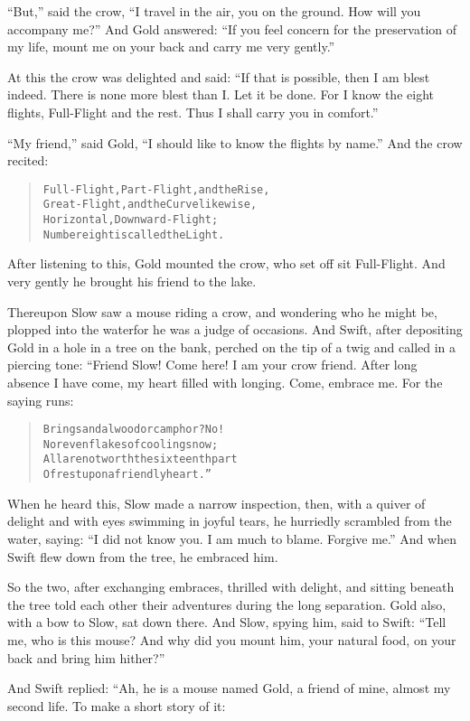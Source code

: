 \documentclass[article, twoside, 14pt]{memoir}
\renewenvironment{verbatim}{%
\begin{quote}%
\vskip -10pt%
\begin{alltt}\normalfont\large}{\end{alltt}%
\end{quote}%
\vskip -10pt
} %
\begin{document}
``But,'' said the crow,
``I travel in the air, you on the ground. How will you accompany me?''
And Gold answered:
``If you feel concern for the preservation of my life, mount me on your back and carry me very gently.''

At this the crow was delighted and said:
``If that is possible, then I am blest indeed. There is none more blest than I. Let it be done. For I know the eight flights, Full-Flight and the rest. Thus I shall carry you in comfort.''

``My friend,'' said Gold,
``I should like to know the flights by name.'' And the crow
recited:

\begin{verbatim}
Full-Flight, Part-Flight, and the Rise,
Great-Flight, and the Curve likewise,
Horizontal, Downward-Flight;
Number eight is called the Light.
\end{verbatim}
After listening to this, Gold mounted the crow, who set off
sit Full-Flight. And very gently he brought his friend to the
lake.

Thereupon Slow saw a mouse riding a crow, and wondering who he
might be, plopped into the water{\textemdash}for he was a judge of occasions.
And Swift, after depositing Gold in a hole in a tree on the bank,
perched on the tip of a twig and called in a piercing tone: “Friend
Slow! Come here! I am your crow friend. After long absence I have
come, my heart filled with longing. Come, embrace me. For the
saying runs:

\begin{verbatim}
Bring sandalwood or camphor? No!
Nor even flakes of cooling snow;
All are not worth the sixteenth part
Of rest upon a friendly heart.”
\end{verbatim}
When he heard this, Slow made a narrow inspection, then, with a
quiver of delight and with eyes swimming in joyful tears, he
hurriedly scrambled from the water, saying:
``I did not know you. I am much to blame. Forgive me.'' And when
Swift flew down from the tree, he embraced him.

So the two, after exchanging embraces, thrilled with delight, and
sitting beneath the tree told each other their adventures during
the long separation. Gold also, with a bow to Slow, sat down there.
And Slow, spying him, said to Swift:
``Tell me, who is this mouse? And why did you mount him, your natural food, on your back and bring him hither?''

And Swift replied: “Ah, he is a mouse named Gold, a friend of mine,
almost my second life. To make a short story of it:
\end{document}
